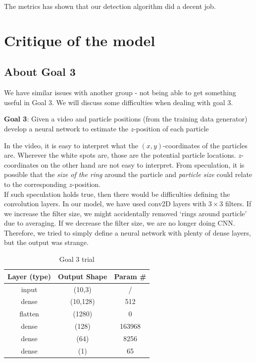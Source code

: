 \documentclass[11pt,a4paper]{scrartcl}
\begin{document}
The metrics has shown that our detection algorithm did a decent job.
\newpage

\section{Critique of the model}

\subsection{About Goal 3}
We have similar issues with another group - not being able to get something useful in Goal 3. We will discuss some difficulties when dealing with goal 3.

\begin{center}
    \textbf{Goal 3}: Given a video and particle positions (from the training data generator)\\
    develop a neural network to estimate the $z$-position of each particle
\end{center}

In the video, it is easy to interpret what the $(x,y)$-coordinates of the particles are. Wherever the white spots are, those are the potential particle locations. $z$-coordinates on the other hand are not easy to interpret. From speculation, it is possible that the \textit{size of the ring} around the particle and \textit{particle size} could relate to the corresponding $z$-position. \\

If such speculation holds true, then there would be difficulties defining the convolution layers. In our model, we have used conv2D layers with $3\times 3$ filters. If we increase the filter size, we might accidentally removed `rings around particle' due to averaging. If we decrease the filter size, we are no longer doing CNN. \\

Therefore, we tried to simply define a neural network with plenty of dense layers, but the output was strange. 

\begin{table}[h]
\centering
\begin{tabular}{ccc}
\toprule
\textbf{Layer (type)} & \textbf{Output Shape} & \textbf{Param \#} \\
\midrule
    input & (10,3) & / \\
    dense & (10,128) & 512 \\
    flatten & (1280) & 0 \\
    dense & (128) & 163968 \\
    dense & (64) & 8256 \\
    dense & (1) & 65 \\
\bottomrule
\end{tabular}
\caption{Goal 3 trial}
\end{table}
\end{document}
